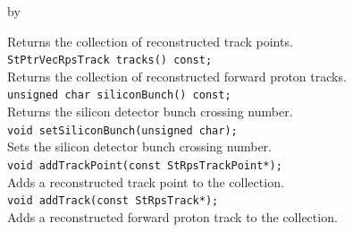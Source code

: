 \documentclass[twoside]{article}
\newcommand{\entrylabel}[1]{\mbox{\textbf{{#1}}}\hfil}%
\newenvironment{entry}
{\begin{list}{}%
    {\renewcommand{\makelabel}{\entrylabel}%
     \setlength{\labelwidth}{90pt}%
     \setlength{\leftmargin}{\labelwidth}
     \advance\leftmargin by \labelsep%
      }%
    }%
  {\end{list}}
\newcommand{\Entrylabel}[1]%
{\raisebox{0pt}[1ex][0pt]{\makebox[\labelwidth][l]%
    {\parbox[t]{\labelwidth}{\hspace{0pt}\textbf{{#1}}}}}}
\newenvironment{Entry}%
{\renewcommand{\entrylabel}{\Entrylabel}\begin{entry}}%
  {\end{entry}}
\begin{document}
\begin{Entry}
    Returns the collection of reconstructed track points.\\
    \verb+StPtrVecRpsTrack tracks() const;+\\
    Returns the collection of reconstructed forward proton tracks.\\
    \verb+unsigned char siliconBunch() const;+\\
    Returns the silicon detector bunch crossing number.\\
    \verb+void setSiliconBunch(unsigned char);+\\
    Sets the silicon detector bunch crossing number.\\
    \verb+void addTrackPoint(const StRpsTrackPoint*);+\\
    Adds a reconstructed track point to the collection.\\
    \verb+void addTrack(const StRpsTrack*);+\\
    Adds a reconstructed forward proton track to the collection.\\
\end{Entry}
\clearpage

\end{document}
